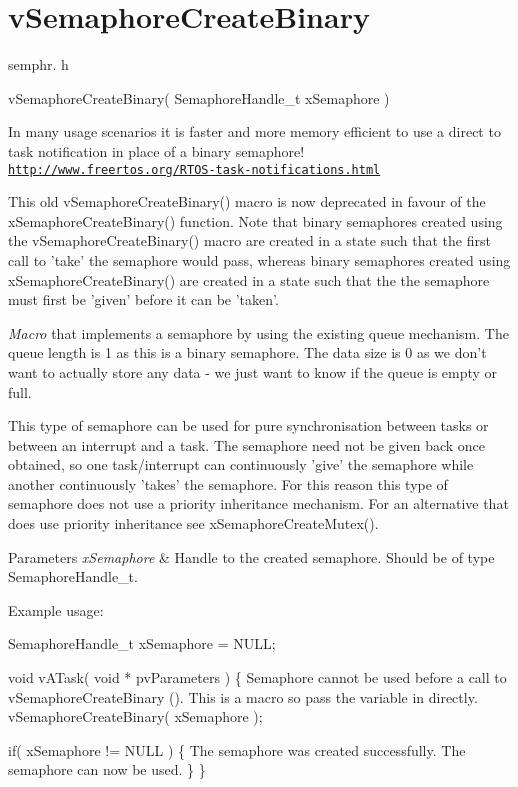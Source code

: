 \hypertarget{group__vSemaphoreCreateBinary}{\section{v\-Semaphore\-Create\-Binary}
\label{group__vSemaphoreCreateBinary}
}
semphr. h 
\begin{DoxyPre}vSemaphoreCreateBinary( SemaphoreHandle\_t xSemaphore )\end{DoxyPre}


In many usage scenarios it is faster and more memory efficient to use a direct to task notification in place of a binary semaphore! \href{http://www.freertos.org/RTOS-task-notifications.html}{\tt http\-://www.\-freertos.\-org/\-R\-T\-O\-S-\/task-\/notifications.\-html}

This old v\-Semaphore\-Create\-Binary() macro is now deprecated in favour of the x\-Semaphore\-Create\-Binary() function. Note that binary semaphores created using the v\-Semaphore\-Create\-Binary() macro are created in a state such that the first call to 'take' the semaphore would pass, whereas binary semaphores created using x\-Semaphore\-Create\-Binary() are created in a state such that the the semaphore must first be 'given' before it can be 'taken'.

{\itshape Macro} that implements a semaphore by using the existing queue mechanism. The queue length is 1 as this is a binary semaphore. The data size is 0 as we don't want to actually store any data -\/ we just want to know if the queue is empty or full.

This type of semaphore can be used for pure synchronisation between tasks or between an interrupt and a task. The semaphore need not be given back once obtained, so one task/interrupt can continuously 'give' the semaphore while another continuously 'takes' the semaphore. For this reason this type of semaphore does not use a priority inheritance mechanism. For an alternative that does use priority inheritance see x\-Semaphore\-Create\-Mutex().


\begin{DoxyParams}{Parameters}
{\em x\-Semaphore} & Handle to the created semaphore. Should be of type Semaphore\-Handle\-\_\-t.\\
\hline
\end{DoxyParams}
Example usage\-: 
\begin{DoxyPre}
 SemaphoreHandle\_t xSemaphore = NULL;\end{DoxyPre}



\begin{DoxyPre} void vATask( void * pvParameters )
 \{
Semaphore cannot be used before a call to vSemaphoreCreateBinary ().
This is a macro so pass the variable in directly.
    vSemaphoreCreateBinary( xSemaphore );\end{DoxyPre}



\begin{DoxyPre}    if( xSemaphore != NULL )
    \{
The semaphore was created successfully.
The semaphore can now be used.
    \}
 \}
 \end{DoxyPre}
 